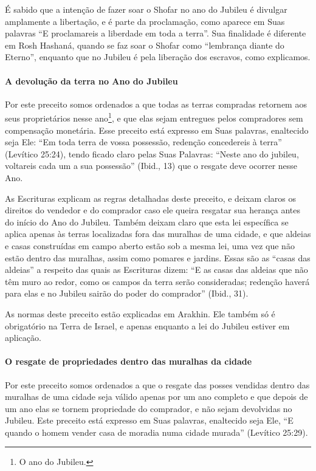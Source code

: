É sabido que a intenção de fazer soar o Shofar no ano do Jubileu é
divulgar amplamente a libertação, e é parte da proclamação, como aparece
em Suas palavras ``E proclamareis a liberdade em toda a terra''. Sua
finalidade é diferente em Rosh Hashaná, quando se faz soar o Shofar
como ``lembrança diante do Eterno'', enquanto que no Jubileu é pela
liberação dos escravos, como explicamos.

\paragraph{A devolução da terra no Ano do Jubileu}

Por este preceito somos ordenados a que todas as terras compradas
retornem aos seus proprietários nesse ano\footnote{O ano do Jubileu.}, e que
elas sejam entregues pelos compradores sem compensação monetária. Esse
preceito está expresso em Suas palavras, enaltecido seja Ele: ``Em toda
terra de vossa possessão, redenção concedereis à terra'' (Levítico
25:24), tendo ficado claro pelas Suas Palavras: ``Neste ano do jubileu,
voltareis cada um a sua possessão'' (Ibid., 13) que o resgate deve
ocorrer nesse Ano.

As Escrituras explicam as regras detalhadas deste preceito, e deixam
claros os direitos do vendedor e do comprador caso ele queira resgatar
sua herança antes do início do Ano do Jubileu. Também deixam claro que
esta lei específica se aplica apenas às terras localizadas fora das
muralhas de uma cidade, e que aldeias e casas construídas em campo
aberto estão sob a mesma lei, uma vez que não estão dentro das muralhas,
assim como pomares e jardins. Essas são as ``casas das aldeias'' a
respeito das quais as Escrituras dizem: ``E as casas das aldeias que não
têm muro ao redor, como os campos da terra serão consideradas; redenção
haverá para elas e no Jubileu sairão do poder do comprador'' (Ibid., 31).

As normas deste preceito estão explicadas em Arakhin. Ele também só é
obrigatório na Terra de Israel, e apenas enquanto a lei do Jubileu
estiver em aplicação.

\paragraph{O resgate de propriedades dentro das muralhas da cidade}

Por este preceito somos ordenados a que o resgate das posses vendidas
dentro das muralhas de uma cidade seja válido apenas por um ano
completo e que depois de um ano elas se tornem propriedade do
comprador, e não sejam devolvidas no Jubileu. Este preceito está
expresso em Suas palavras, enaltecido seja Ele, ``E quando o homem
vender casa de moradia numa cidade murada'' (Levítico 25:29).

